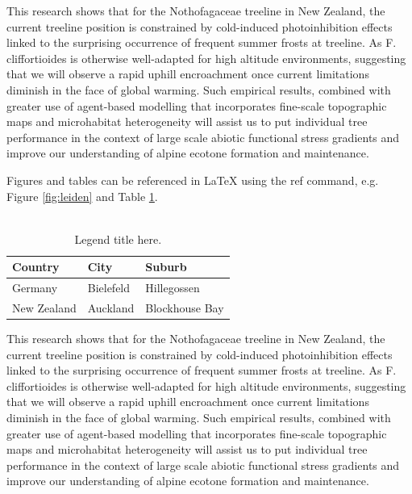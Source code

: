 \documentclass[12pt]{article}
\begin{document}
\noindent This research shows that for the Nothofagaceae treeline in New Zealand, the current treeline position is constrained by cold-induced photoinhibition effects linked to the surprising occurrence of frequent summer frosts at treeline. As F. cliffortioides is otherwise well-adapted for high altitude environments, suggesting that we will observe a rapid uphill encroachment once current limitations diminish in the face of global warming. Such empirical results, combined with greater use of agent-based modelling that incorporates fine-scale topographic maps and microhabitat heterogeneity will assist us to put individual tree performance in the context of large scale abiotic functional stress gradients and improve our understanding of alpine ecotone formation and maintenance.


Figures and tables can be referenced in LaTeX using the ref command, e.g. Figure \ref{fig:leiden} and Table \ref{tab:citytable}.\\
\\


\begin{table}[ht]
\caption{\label{tab:citytable} Legend title here.}
\centering
\begin{tabular}{|l|l|l|}  %
\hline
Country & City & Suburb \\
\hline
Germany & Bielefeld & Hillegossen \\
\hline
New Zealand & Auckland & Blockhouse Bay \\
\hline
\end{tabular}
\end{table}

\noindent This research shows that for the Nothofagaceae treeline in New Zealand, the current treeline position is constrained by cold-induced photoinhibition effects linked to the surprising occurrence of frequent summer frosts at treeline. As F. cliffortioides is otherwise well-adapted for high altitude environments, suggesting that we will observe a rapid uphill encroachment once current limitations diminish in the face of global warming. Such empirical results, combined with greater use of agent-based modelling that incorporates fine-scale topographic maps and microhabitat heterogeneity will assist us to put individual tree performance in the context of large scale abiotic functional stress gradients and improve our understanding of alpine ecotone formation and maintenance.
\end{document}
